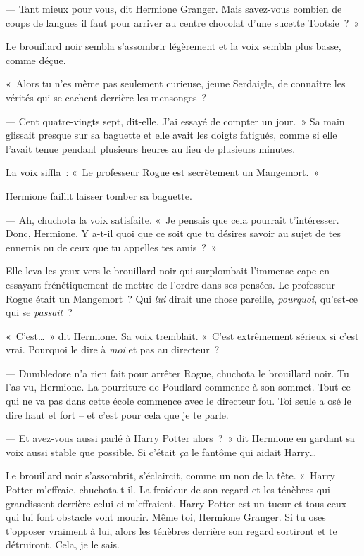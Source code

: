--- Tant mieux pour vous, dit Hermione Granger.
Mais savez-vous combien de coups de langues il faut pour arriver au centre chocolat d'une sucette Tootsie~?~»

Le brouillard noir sembla s'assombrir légèrement et la voix sembla plus basse, comme déçue.

«~Alors tu n'es même pas seulement curieuse, jeune Serdaigle, de connaître les vérités qui se cachent derrière les mensonges~?

--- Cent quatre-vingts sept, dit-elle.
J'ai essayé de compter un jour.~»
Sa main glissait presque sur sa baguette et elle avait les doigts fatigués, comme si elle l'avait tenue pendant plusieurs heures au lieu de plusieurs minutes.

La voix siffla~: «~Le professeur Rogue est secrètement un Mangemort.~»

Hermione faillit laisser tomber sa baguette.

--- Ah, chuchota la voix satisfaite.
«~Je pensais que cela pourrait t'intéresser.
Donc, Hermione.
Y a-t-il quoi que ce soit que tu désires savoir au sujet de tes ennemis ou de ceux que tu appelles tes amis~?~»

Elle leva les yeux vers le brouillard noir qui surplombait l'immense cape en essayant frénétiquement de mettre de l'ordre dans ses pensées.
Le professeur Rogue était un Mangemort~?
Qui \emph{lui} dirait une chose pareille, \emph{pourquoi}, qu'est-ce qui se \emph{passait}~?

«~C'est…~»
dit Hermione.
Sa voix tremblait.
«~C'est extrêmement sérieux si c'est vrai.
Pourquoi le dire à \emph{moi} et pas au directeur~?

--- Dumbledore n'a rien fait pour arrêter Rogue, chuchota le brouillard noir.
Tu l'as vu, Hermione.
La pourriture de Poudlard commence à son sommet.
Tout ce qui ne va pas dans cette école commence avec le directeur fou.
Toi seule a osé le dire haut et fort -- et c'est pour cela que je te parle.

--- Et avez-vous aussi parlé à Harry Potter alors~?~»
dit Hermione en gardant sa voix aussi stable que possible.
Si c'était \emph{ça} le fantôme qui aidait Harry…

Le brouillard noir s'assombrit, s'éclaircit, comme un non de la tête.
«~Harry Potter m'effraie, chuchota-t-il.
La froideur de son regard et les ténèbres qui grandissent derrière celui-ci m'effraient.
Harry Potter est un tueur et tous ceux qui lui font obstacle vont mourir.
Même toi, Hermione Granger.
Si tu oses t'opposer vraiment à lui, alors les ténèbres derrière son regard sortiront et te détruiront.
Cela, je le sais.

